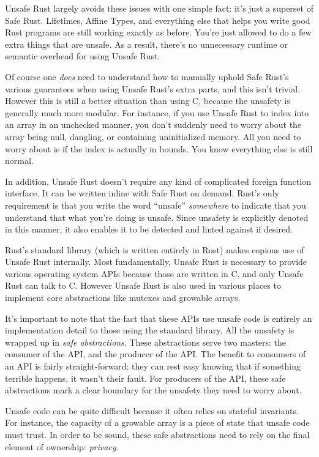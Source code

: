 Unsafe Rust largely avoids these issues with one simple fact:
it's just a superset of Safe Rust. Lifetimes, Affine Types, and everything else
that helps you write good Rust programs are still working exactly as before.
You're just allowed to do a few extra things that are unsafe. As a result,
there's no unnecessary runtime or semantic overhead for using Unsafe Rust.

Of course one \emph{does} need to understand how to manually uphold Safe Rust's
various guarantees when using Unsafe Rust's extra parts, and this isn't trivial.
However this is still a better situation than using C, because the unsafety is
generally much more modular. For instance, if you use Unsafe Rust to index into
an array in an unchecked manner, you don't suddenly need to worry about the
array being null, dangling, or containing uninitialized memory. All you need to
worry about is if the index is actually in bounds. You know everything else is
still normal.

In addition, Unsafe Rust doesn't require any kind of complicated foreign
function interface. It can be written inline with Safe Rust on demand. Rust's
only requirement is that you write the word ``unsafe'' \emph{somewhere} to indicate
that you understand that what you're doing is unsafe. Since unsafety is
explicitly denoted in this manner, it also enables it to be detected and linted
against if desired.

Rust's standard library (which is written entirely in Rust) makes copious use of
Unsafe Rust internally. Most fundamentally, Unsafe Rust is necessary to provide
various operating system APIs because those are written in C, and only Unsafe
Rust can talk to C. However Unsafe Rust is also used in various places to
implement core abstractions like mutexes and growable arrays.

It's important to note that the fact that these APIs use unsafe code is entirely
an implementation detail to those using the standard library. All the unsafety
is wrapped up in \emph{safe abstractions}. These abstractions serve two masters: the
consumer of the API, and the producer of the API. The benefit to consumers of an
API is fairly straight-forward: they can rest easy knowing that if something
terrible happens, it wasn't their fault. For producers of the API, these safe
abstractions mark a clear boundary for the unsafety they need to worry about.

Unsafe code can be quite difficult because it often relies on stateful
invariants. For instance, the capacity of a growable array is a piece of state
that unsafe code must trust. In order to be sound, these safe abstractions need
to rely on the final element of ownership: \emph{privacy}.

